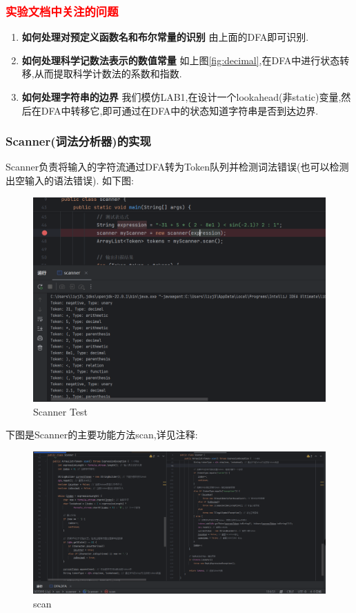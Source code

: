 \documentclass{article}
\begin{document}
\subsubsection{\textcolor{red}{实验文档中关注的问题}}
\begin{enumerate}
    \item \textbf{如何处理对预定义函数名和布尔常量的识别}  由上面的DFA即可识别.
    \item \textbf{如何处理科学记数法表示的数值常量}
          如上图\ref{fig:decimal},在DFA中进行状态转移,从而提取科学计数法的系数和指数.

    \item  \textbf{如何处理字符串的边界}
          我们模仿LAB1,在设计一个lookahead(非static)变量,然后在DFA中转移它,即可通过在DFA中的状态知道字符串是否到达边界.
\end{enumerate}
\subsubsection{Scanner(词法分析器)的实现}
Scanner负责将输入的字符流通过DFA转为Token队列并检测词法错误(也可以检测出空输入的语法错误).
如下图:
\begin{figure}[H]
    \centering
    \includegraphics[width=0.8\linewidth]{ScannerTest.png}
    \caption{Scanner Test}
    \label{fig:ScannerTest}
\end{figure}
下图是Scanner的主要功能方法scan,详见注释:
\begin{figure}[H]
    \centering
    \includegraphics[width=\linewidth]{image20.png}
    \caption{scan}
    \label{fig:image20}
\end{figure}
\end{document}
